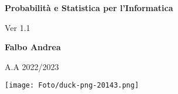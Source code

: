 \documentclass[a4paper,12pt]{report}
\begin{document}
\begin{titlepage}
    \begin{center}
        \vspace*{1cm}
            
        \Huge
        \textbf{Probabilità e Statistica per l'Informatica}
            
        \vspace{0.5cm}
        \LARGE
        Ver 1.1
            
        \vspace{1.5cm}
            
        \textbf{Falbo Andrea}
            
        \vfill
            
        A.A 2022/2023 \\
            
        \vspace{0.8cm}
            
        \texttt{[image: Foto/duck-png-20143.png]}
            
    \end{center}
\end{titlepage}

\tableofcontents

\end{document}
